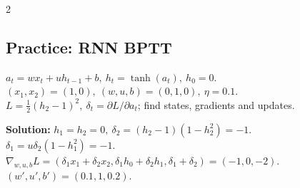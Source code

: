 \documentclass[a4paper]{article}
\begin{document}
\begin{multicols}{2}
\subsection*{Practice: RNN BPTT}
\noindent \(a_t=wx_t+uh_{t-1}+b,\ h_t=\tanh(a_t),\ h_0=0\).\\
\((x_1,x_2)=(1,0),\ (w,u,b)=(0,1,0),\ \eta=0.1\).\\
\(L=\tfrac12(h_2-1)^2,\ \delta_t=\partial L/\partial a_t\); find states, gradients and updates.\par
\noindent \textbf{Solution:} \(h_1=h_2=0,\ \delta_2=(h_2-1)(1-h_2^2)=-1\).\\
\(\delta_1=u\delta_2(1-h_1^2)=-1\).\\
\(\nabla_{w,u,b}L=(\delta_1x_1+\delta_2x_2,\delta_1h_0+\delta_2h_1,\delta_1+\delta_2)=(-1,0,-2)\).\\
\((w',u',b')=(0.1,1,0.2)\).\par
\end{multicols}
\end{document}
